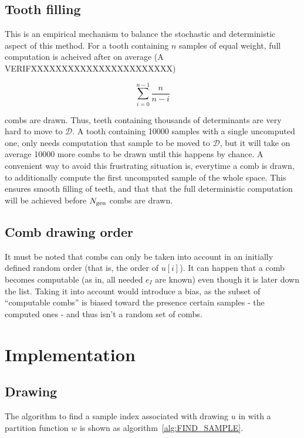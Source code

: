 \documentclass[./thesis.tex]{subfiles}
\begin{document}
\subsection{Tooth filling}

This is an empirical mechanism to balance the stochastic and deterministic aspect of this method. For a tooth containing $n$ samples of equal weight, full computation is acheived after on average (A VERIFXXXXXXXXXXXXXXXXXXXXXXX)

\begin{equation}
\sum_{i=0}^{n-1} \frac{n}{n-i}
\end{equation}

combs are drawn. Thus, teeth containing thousands of determinants are very hard to move to $\mathcal{D}$. A tooth containing 10000 samples with a single uncomputed one, only needs computation that sample to be moved to $\mathcal{D}$, but it will take on average 10000 more combs to be drawn until this happens by chance.
A convenient way to avoid this frustrating situation is, everytime a comb is drawn, to additionally compute the first uncomputed sample of the whole space. This ensures smooth filling of teeth, and that that the full deterministic computation will be achieved before ${N_\text{gen}}$ combs are drawn.


\subsection{Comb drawing order}

It must be noted that combs can only be taken into account in an initially defined random order (that is, the order of $u[i]$).
It can happen that a comb becomes computable (as in, all needed $e_I$ are known) even though it is later down the list. Taking it into account would introduce a bias, as the subset of ``computable combs'' is biased toward the presence certain samples - the computed ones - and thus isn't a random set of combs.


\section{Implementation}


\subsection{Drawing}

The algorithm to find a sample index associated with drawing $u$ in with a partition function $w$ is shown as algorithm~\ref{alg:FIND_SAMPLE}.
\end{document}
